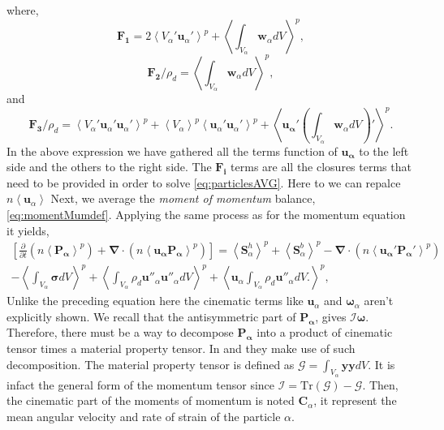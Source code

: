 where,
\begin{equation*}
    \bm{F_1}
    = 2\left<V_\alpha'\bm{u}_\alpha'\right>^p
    +  \left<\int_{V_\alpha} \bm{w}_\alpha dV\right>^p,
\end{equation*} 
\begin{equation*}
    \bm{F_2}/\rho_d
    = \left<\int_{V_\alpha} \bm{w}_\alpha dV\right>^p,
\end{equation*}
and
\begin{equation*}
    \bm{F_3}/\rho_d
    = \left<V_\alpha' \bm{u}_\alpha'\bm{u}_\alpha'\right>^p
    + \left<V_\alpha\right>^p \left<\bm{u}_\alpha'\bm{u}_\alpha'\right>^p
    +\left<\bm{u_\alpha}'\left(\int_{V_\alpha} \bm{w}_\alpha dV\right)'\right>^p.
\end{equation*}
In the above expression we have gathered all  the terms function of $\bm{u_\alpha}$ to the left side and the others to the right side. 
The $\bm{F_i}$ terms are all the closures terms that need to be provided in order to solve \ref{eq:particlesAVG}.
Here to we can repalce $n\left<\bm{u}_\alpha\right>$
Next, we average the \textit{moment of momentum} balance, \ref{eq:momentMumdef}. 
Applying the same process as for the momentum equation it yields, 
\begin{multline}
    \left[
        \frac{\partial }{\partial t}(n\left<\bm{P_\alpha}\right>^p) 
    + \bm{\nabla}\cdot(n\left<\bm{u_\alpha}\bm{P_\alpha}\right>^p)
    \right] 
    = \left<\bm{S}_\alpha^{h}\right>^p
    + \left< \bm{S}_\alpha^{b}\right>^p
    - \bm{\nabla}\cdot(n\left<\bm{u_\alpha}'\bm{P_\alpha}'\right>^p)\\
    - \left< \int_{V_\alpha} \bm{\sigma} dV\right>^p
    + \left< \int_{V_\alpha}\rho_d \bm{u''}_\alpha \bm{u''}_\alpha dV\right>^p
    + \left< \bm{u}_\alpha \int_{V_\alpha}\rho_d  \bm{u''}_\alpha dV.\right>^p,
\end{multline} 
Unlike the preceding equation here the cinematic terms like $\bm{u}_\alpha$ and $\bm{\omega}_\alpha$ aren't explicitly shown. 
We recall that the antisymmetric part of $\bm{P_\alpha}$, gives $\bm{\mathcal{I}} \bm{\omega}$.
Therefore, there must be a way to decompose $\bm{P_\alpha}$ into a product of cinematic tensor times a material property tensor. 
In \citet{willen2019resolved} and \citet{Pumir2013} they make use of such decomposition. 
The material property tensor is defined as $\bm{\mathcal{G}} = \int_{V_\alpha} \bm{y}\bm{y} dV$. 
It is infact the general form of the momentum tensor since $\bm{\mathcal{I}} = \text{Tr}(\bm{\mathcal{G}})-\bm{\mathcal{G}}$. 
Then, the cinematic part of the moments of momentum is noted  $\bm{C}_\alpha$, it represent the mean angular velocity and rate of strain of the particle $\alpha$. 


